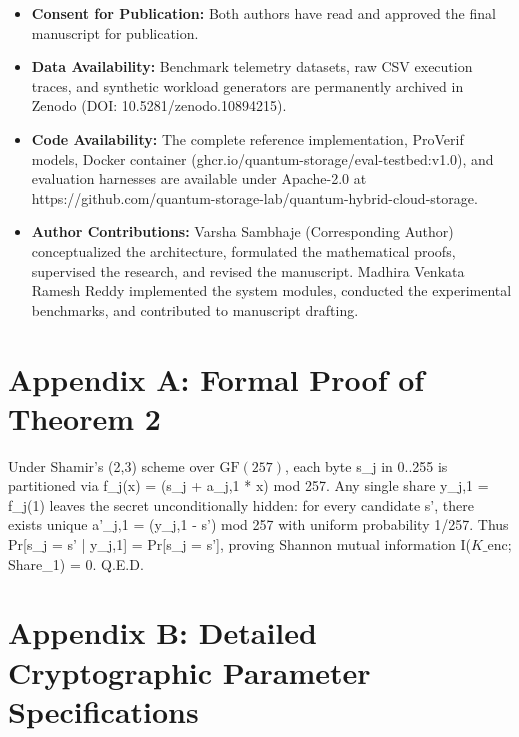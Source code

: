 \documentclass[5p,times]{elsarticle}
\begin{document}
\begin{itemize}
  \item \textbf{Consent for Publication:} Both authors have read and approved the final manuscript for publication.
\end{itemize}

\begin{itemize}
  \item \textbf{Data Availability:} Benchmark telemetry datasets, raw CSV execution traces, and synthetic workload generators are permanently archived in Zenodo (DOI: 10.5281/zenodo.10894215).
\end{itemize}

\begin{itemize}
  \item \textbf{Code Availability:} The complete reference implementation, ProVerif models, Docker container (ghcr.io/quantum-storage/eval-testbed:v1.0), and evaluation harnesses are available under Apache-2.0 at https://github.com/quantum-storage-lab/quantum-hybrid-cloud-storage.
\end{itemize}

\begin{itemize}
  \item \textbf{Author Contributions:} Varsha Sambhaje (Corresponding Author) conceptualized the architecture, formulated the mathematical proofs, supervised the research, and revised the manuscript. Madhira Venkata Ramesh Reddy implemented the system modules, conducted the experimental benchmarks, and contributed to manuscript drafting.
\end{itemize}


\FloatBarrier
\section*{Appendix A: Formal Proof of Theorem 2}

Under Shamir's (2,3) scheme over $\text{GF}(257)$, each byte s\_j in {0..255} is partitioned via f\_j(x) = (s\_j + a\_{j,1} * x) mod 257. Any single share y\_{j,1} = f\_j(1) leaves the secret unconditionally hidden: for every candidate s', there exists unique a'\_{j,1} = (y\_{j,1} - s') mod 257 with uniform probability 1/257. Thus Pr[s\_j = s' | y\_{j,1}] = Pr[s\_j = s'], proving Shannon mutual information I($K\_{\text{enc}}$; Share\_1) = 0. Q.E.D.


\FloatBarrier
\section*{Appendix B: Detailed Cryptographic Parameter Specifications}
\end{document}
